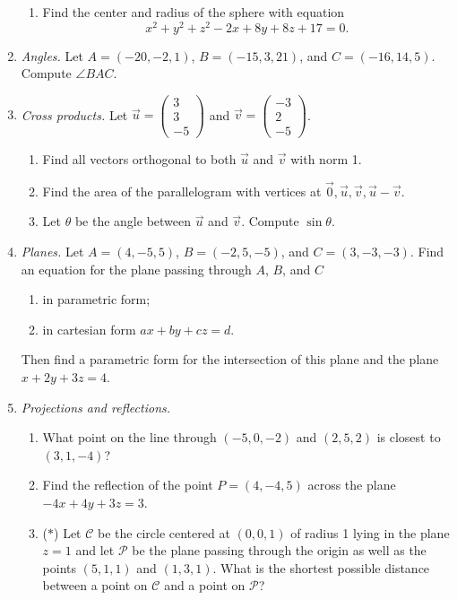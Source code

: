 \begin{enumerate}
\begin{enumerate}
\item Find the center and radius of the sphere with equation
\begin{equation*}
x^2 + y^2 + z^2 - 2x + 8y + 8z + 17 = 0.
\end{equation*}
\end{enumerate}
\item \emph{Angles.} Let $A = (-20,-2,1)$, $B = (-15,3,21)$, and $C = (-16,14,5)$. Compute $\angle BAC$.
\item \emph{Cross products.} Let $\vec{u} = \begin{pmatrix} 3 \\ 3 \\ -5 \end{pmatrix}$ and $\vec{v} = \begin{pmatrix} -3 \\ 2 \\ -5 \end{pmatrix}$.
\begin{enumerate}
\item Find all vectors orthogonal to both $\vec{u}$ and $\vec{v}$ with norm 1.
\item Find the area of the parallelogram with vertices at $\vec{0}, \vec{u}, \vec{v}, \vec{u} - \vec{v}$.
\item Let $\theta$ be the angle between $\vec{u}$ and $\vec{v}$. Compute $\sin\theta$.
\end{enumerate}
\item \emph{Planes.} Let $A = (4,-5,5)$, $B = (-2,5,-5)$, and $C = (3,-3,-3)$. Find an equation for the plane passing through $A$, $B$, and $C$
\begin{enumerate}
\item in parametric form;
\item in cartesian form $ax + by + cz = d$.
\end{enumerate}
Then find a parametric form for the intersection of this plane and the plane $x + 2y + 3z = 4$.
\newpage
\item \emph{Projections and reflections.}
\begin{enumerate}
\item What point on the line through $(-5,0,-2)$ and $(2,5,2)$ is closest to $(3,1,-4)$?
\item Find the reflection of the point $P = (4,-4,5)$ across the plane $-4x + 4y + 3z = 3$.
\item ($*$) Let $\mathcal{C}$ be the circle centered at $(0,0,1)$ of radius 1 lying in the plane $z = 1$ and let $\mathcal{P}$ be the plane passing through the origin as well as the points $(5,1,1)$ and $(1,3,1)$. What is the shortest possible distance between a point on $\mathcal{C}$ and a point on $\mathcal{P}$?

\end{enumerate}
\end{enumerate}

